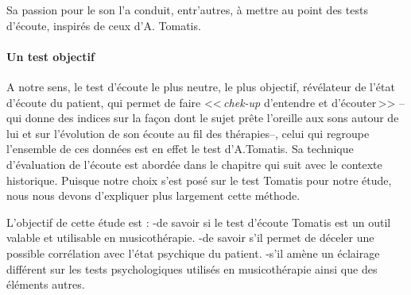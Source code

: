 Sa passion pour le son l'a conduit, entr'autres, à mettre au point des tests
d'écoute, inspirés de ceux d'A. Tomatis.
       

\paragraph{Un test objectif}

A notre sens, le  test d'écoute le plus neutre, le plus objectif, révélateur de l'état d'écoute
du patient, qui permet de faire <<\,\emph{chek-up} d'entendre et d'écouter\,>>
 --qui donne des indices sur la façon dont le sujet prête l'oreille
 aux sons autour de lui et sur l'évolution de son écoute au fil des thérapies--,
celui qui regroupe l'ensemble de ces
données est en effet le test d'A.Tomatis.
Sa technique d'évaluation
de l'écoute est abordée dans le chapitre qui suit avec le contexte
historique.
Puisque notre choix s'est posé sur le test Tomatis pour notre étude, nous nous devons 
d'expliquer plus largement cette méthode.

L'objectif de cette étude est :
-de savoir si le test d'écoute Tomatis est un outil valable et utilisable en musicothérapie.
-de savoir s'il permet de déceler une possible corrélation avec l'état
psychique du patient.
-s'il amène un éclairage différent sur les tests psychologiques
utilisés en musicothérapie ainsi que des éléments autres.
